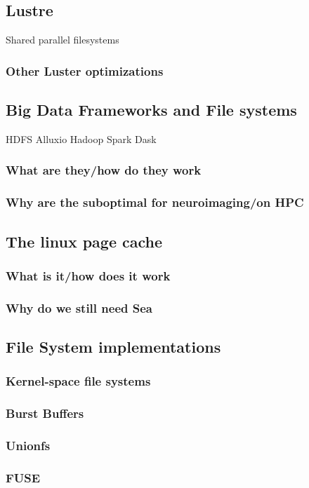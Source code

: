 \documentclass[10pt,journal,compsoc]{IEEEtran}
\begin{document}
\subsection{Lustre}
Shared parallel filesystems
\subsubsection{Other Luster optimizations}
\subsection{Big Data Frameworks and File systems}
HDFS Alluxio Hadoop Spark Dask
\subsubsection{What are they/how do they work}
\subsubsection{Why are the suboptimal for neuroimaging/on HPC}
\subsection{The linux page cache}
\subsubsection{What is it/how does it work}
\subsubsection{Why do we still need Sea}
\subsection{File System implementations}
\subsubsection{Kernel-space file systems}
\subsubsection{Burst Buffers}
\subsubsection{Unionfs}
\subsubsection{FUSE}
\end{document}
